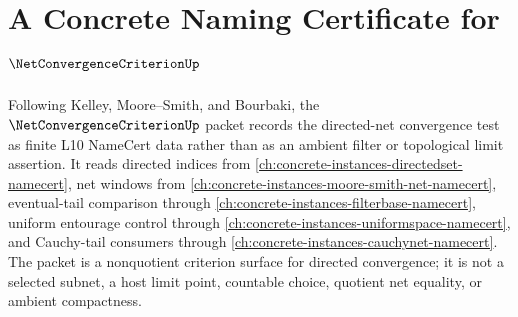 \chapter{A Concrete Naming Certificate for $\NetConvergenceCriterionUp$}
\label{ch:concrete-instances-net-convergence-criterion-namecert}

Following Kelley, Moore--Smith, and Bourbaki, the $\NetConvergenceCriterionUp$ packet records the directed-net convergence test as finite L10 NameCert data rather than as an ambient filter or topological limit assertion. It reads directed indices from \autoref{ch:concrete-instances-directedset-namecert}, net windows from \autoref{ch:concrete-instances-moore-smith-net-namecert}, eventual-tail comparison through \autoref{ch:concrete-instances-filterbase-namecert}, uniform entourage control through \autoref{ch:concrete-instances-uniformspace-namecert}, and Cauchy-tail consumers through \autoref{ch:concrete-instances-cauchynet-namecert}. The packet is a nonquotient criterion surface for directed convergence; it is not a selected subnet, a host limit point, countable choice, quotient net equality, or ambient compactness.

